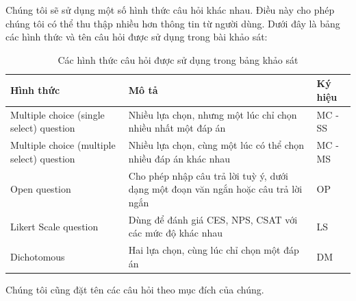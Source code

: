 Chúng tôi sẽ sử dụng một số hình thức câu hỏi khác nhau. Điều này cho phép chúng tôi có thể thu thập nhiều hơn thông tin từ người dùng. Dưới đây là bảng các hình thức và tên câu hỏi được sử dụng trong bài khảo sát:
\begin{center}
\begin{table}[!h]
    \begin{tabular}{|p{4cm} |p{8cm} |p{2cm}|}
        \hline
            Hình thức  & Mô tả & Ký hiệu \\ [0.5ex]
        \hline
            Multiple choice (single select) question & 
            Nhiều lựa chọn, nhưng một lúc chỉ chọn nhiều nhất một đáp án &
            MC - SS \\ 
        \hline
            Multiple choice (multiple select) question & 
            Nhiều lựa chọn, cùng một lúc có thể chọn nhiều đáp án khác nhau & 
            MC - MS \\
        \hline
            Open question & 
            Cho phép nhập câu trả lời tuỳ ý, dưới dạng một đoạn văn ngắn hoặc câu trả lời ngắn & 
            OP \\
        \hline
            Likert Scale question & 
            Dùng để đánh giá CES, NPS, CSAT với các mức độ khác nhau & 
            LS \\
        \hline
            Dichotomous & 
            Hai lựa chọn, cùng lúc chỉ chọn một đáp án & 
            DM \\ [1ex] 
        \hline
    \end{tabular}
    \caption{Các hình thức câu hỏi được sử dụng trong bảng khảo sát}
\end{table}
\end{center}
\par
Chúng tôi cũng đặt tên các câu hỏi theo mục đích của chúng.
